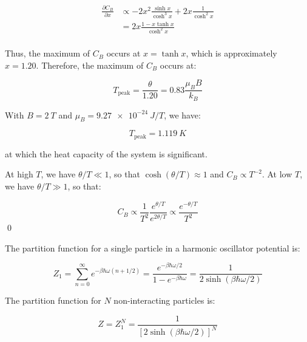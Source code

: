\documentclass[12pt]{article}
\begin{document}
\begin{equation}
    \begin{split}
        \frac{\partial C_{B}}{\partial x} &\propto -2x^{2} \frac{\sinh{x}}{\cosh^{3}{x}} + 2x \frac{1}{\cosh^{2}{x}} \\
        &= 2x \frac{1 - x \tanh{x}}{\cosh^{2}{x}} \\
    \end{split}
\end{equation}

Thus, the maximum of $C_{B}$ occurs at $x = \tanh{x}$, which is approximately $x = 1.20$. Therefore, the maximum of $C_{B}$ occurs at:

\begin{equation}
    T_{\text{peak}} = \frac{\theta}{1.20} = 0.83 \frac{\mu_{B} B}{k_{B}}
\end{equation}

With $B = \qty{2}{T}$ and $\mu_{B} = \qty{9.27e-24}{J/T}$, we have:

\begin{equation}
    T_{\text{peak}} = \qty{1.119}{K}
\end{equation}

at which the heat capacity of the system is significant.

At high $T$, we have $\theta/T \ll 1$, so that $\cosh{(\theta/T)} \approx 1$ and $C_{B} \propto T^{-2}$. At low $T$, we have $\theta/T \gg 1$, so that:

\begin{equation}
    C_{B} \propto \frac{1}{T^{2}} \frac{e^{\theta/T}}{e^{2\theta/T}} \propto \frac{e^{-\theta/T}}{T^{2}}
\end{equation}
\qed


The partition function for a single particle in a harmonic oscillator potential is:

\begin{equation}
    Z_{1} = \sum_{n=0}^{\infty} e^{-\beta \hbar \omega (n + 1/2)} = \frac{e^{-\beta \hbar \omega/2}}{1 - e^{-\beta \hbar \omega}} = \frac{1}{2 \sinh{\left( \beta \hbar \omega / 2 \right)}}
\end{equation}

The partition function for $N$ non-interacting particles is:

\begin{equation}
    Z = Z_{1}^{N} = \frac{1}{\left[ 2 \sinh{\left( \beta \hbar \omega / 2 \right)} \right]^{N}}
\end{equation}
\end{document}
